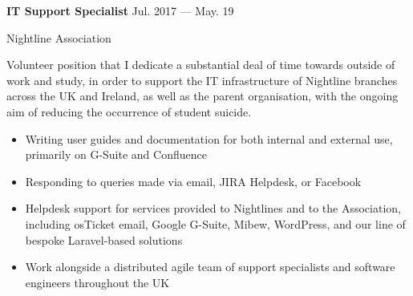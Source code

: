 \parbox[t][][t]{\linewidth}{
	\parbox{\linewidth}{{\textbf{IT Support Specialist}}
		\hfill {{Jul. 2017 --- May. 19}}}
	\smallbreak
	
	\parbox{\linewidth}{Nightline Association}
	
	\bigskip
	Volunteer position that I dedicate a substantial deal of time towards outside of work and study, in order to support the IT infrastructure of Nightline branches across the UK and Ireland, as well as the parent organisation, with the ongoing aim of reducing the occurrence of student suicide.
	
	\bigskip
	\begin{itemize}
		\item{Writing user guides and documentation for both internal and external use, primarily on G-Suite and Confluence}\\[-.6em]
		\item{Responding to queries made via email, JIRA Helpdesk, or Facebook}\\[-.6em]
		\item{Helpdesk support for services provided to Nightlines and to the Association, including osTicket email, Google G-Suite, Mibew, WordPress, and our line of bespoke Laravel-based solutions}\\[-.6em]
		\item{Work alongside a distributed agile team of support specialists and software engineers throughout the UK}\\[-.6em]
		\bigskip
		\bigskip
	\end{itemize}
}

	
	
	
